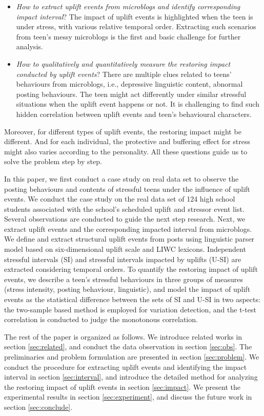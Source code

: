 \begin{itemize}
\item \emph{How to extract uplift events from microblogs and identify corresponding impact interval}?
The impact of uplift events is highlighted when the teen is under stress, with various relative temporal order.
Extracting such scenarios from teen's messy microblogs is the first and basic challenge for further analysis.
\item \emph{How to qualitatively and quantitatively measure the restoring impact conducted by uplift events}?
There are multiple clues related to teens' behaviours from microblogs, i.e.,
depressive linguistic content, abnormal posting behaviours.
The teen might act differently under similar stressful situations when the uplift event happens or not.
It is challenging to find such hidden correlation between uplift events and teen's behavioural characters.
\end{itemize}
Moreover, for different types of uplift events, the restoring impact might be different.
And for each individual, the protective and buffering effect for stress might also varies according to the personality.
All these questions guide us to solve the problem step by step.

In this paper, we first conduct a case study on real data set
to observe the posting behaviours and contents of stressful teens under the influence of uplift events.
We conduct the case study on the real data set of 124 high school students associated with the school's scheduled uplift and stressor event list.
Several observations are conducted to guide the next step research.
Next, we extract uplift events and the corresponding impacted interval from microblogs.
We define and extract structural uplift events from posts using linguistic parser model based
on six-dimensional uplift scale and LIWC lexicons.
Independent stressful intervals (SI) and stressful intervals impacted by uplifts (U-SI) are extracted considering temporal orders.
To quantify the restoring impact of uplift events,
we describe a teen's stressful behaviours in three groups of measures (stress intensity, posting behaviour, linguistic),
and model the impact of uplift events as the statistical difference between the sets of SI and U-SI in two aspects:
the two-sample based method is employed for variation detection,
and the t-test correlation is conducted to judge the monotonous correlation.


The rest of the paper is organized as follows.
We introduce related works in section \ref{sec:related}, 
and conduct the data observation in section \ref{sec:obs}.
The preliminaries and problem formulation are presented in section \ref{sec:problem}.
We conduct the procedure for extracting uplift events and identifying the impact interval in section \ref{sec:interval},
and introduce the detailed method for analyzing the restoring impact of uplift events in section 
\ref{sec:impact}. 
We present the experimental results in section \ref{sec:experiment}, 
and discuss the future work in section \ref{sec:conclude}.